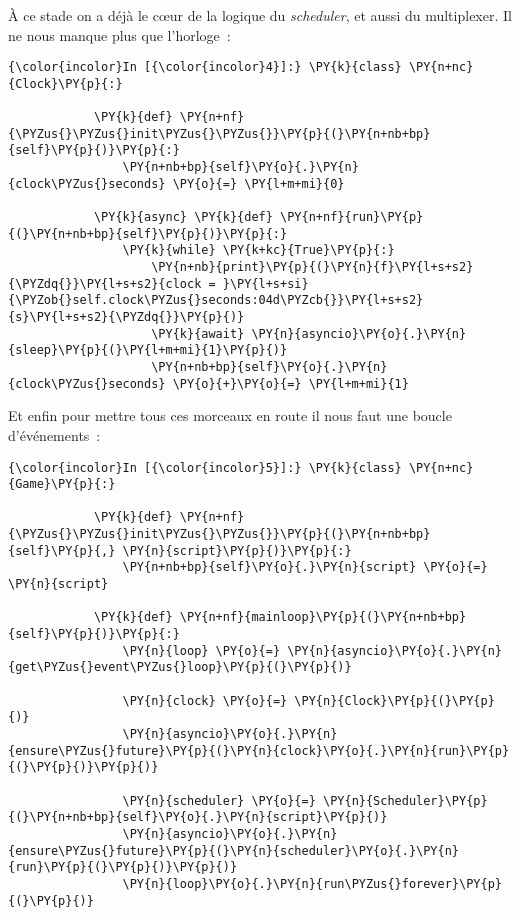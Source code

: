     À ce stade on a déjà le cœur de la logique du \emph{scheduler}, et aussi
du multiplexer. Il ne nous manque plus que l'horloge~:

    \begin{Verbatim}[commandchars=\\\{\}]
{\color{incolor}In [{\color{incolor}4}]:} \PY{k}{class} \PY{n+nc}{Clock}\PY{p}{:}
        
            \PY{k}{def} \PY{n+nf}{\PYZus{}\PYZus{}init\PYZus{}\PYZus{}}\PY{p}{(}\PY{n+nb+bp}{self}\PY{p}{)}\PY{p}{:}
                \PY{n+nb+bp}{self}\PY{o}{.}\PY{n}{clock\PYZus{}seconds} \PY{o}{=} \PY{l+m+mi}{0}
        
            \PY{k}{async} \PY{k}{def} \PY{n+nf}{run}\PY{p}{(}\PY{n+nb+bp}{self}\PY{p}{)}\PY{p}{:}
                \PY{k}{while} \PY{k+kc}{True}\PY{p}{:}
                    \PY{n+nb}{print}\PY{p}{(}\PY{n}{f}\PY{l+s+s2}{\PYZdq{}}\PY{l+s+s2}{clock = }\PY{l+s+si}{\PYZob{}self.clock\PYZus{}seconds:04d\PYZcb{}}\PY{l+s+s2}{s}\PY{l+s+s2}{\PYZdq{}}\PY{p}{)}
                    \PY{k}{await} \PY{n}{asyncio}\PY{o}{.}\PY{n}{sleep}\PY{p}{(}\PY{l+m+mi}{1}\PY{p}{)}
                    \PY{n+nb+bp}{self}\PY{o}{.}\PY{n}{clock\PYZus{}seconds} \PY{o}{+}\PY{o}{=} \PY{l+m+mi}{1}
\end{Verbatim}


    Et enfin pour mettre tous ces morceaux en route il nous faut une boucle
d'événements~:

    \begin{Verbatim}[commandchars=\\\{\}]
{\color{incolor}In [{\color{incolor}5}]:} \PY{k}{class} \PY{n+nc}{Game}\PY{p}{:}
        
            \PY{k}{def} \PY{n+nf}{\PYZus{}\PYZus{}init\PYZus{}\PYZus{}}\PY{p}{(}\PY{n+nb+bp}{self}\PY{p}{,} \PY{n}{script}\PY{p}{)}\PY{p}{:}
                \PY{n+nb+bp}{self}\PY{o}{.}\PY{n}{script} \PY{o}{=} \PY{n}{script}
        
            \PY{k}{def} \PY{n+nf}{mainloop}\PY{p}{(}\PY{n+nb+bp}{self}\PY{p}{)}\PY{p}{:}
                \PY{n}{loop} \PY{o}{=} \PY{n}{asyncio}\PY{o}{.}\PY{n}{get\PYZus{}event\PYZus{}loop}\PY{p}{(}\PY{p}{)}
        
                \PY{n}{clock} \PY{o}{=} \PY{n}{Clock}\PY{p}{(}\PY{p}{)}
                \PY{n}{asyncio}\PY{o}{.}\PY{n}{ensure\PYZus{}future}\PY{p}{(}\PY{n}{clock}\PY{o}{.}\PY{n}{run}\PY{p}{(}\PY{p}{)}\PY{p}{)}
        
                \PY{n}{scheduler} \PY{o}{=} \PY{n}{Scheduler}\PY{p}{(}\PY{n+nb+bp}{self}\PY{o}{.}\PY{n}{script}\PY{p}{)}
                \PY{n}{asyncio}\PY{o}{.}\PY{n}{ensure\PYZus{}future}\PY{p}{(}\PY{n}{scheduler}\PY{o}{.}\PY{n}{run}\PY{p}{(}\PY{p}{)}\PY{p}{)}
                \PY{n}{loop}\PY{o}{.}\PY{n}{run\PYZus{}forever}\PY{p}{(}\PY{p}{)}
\end{Verbatim}


